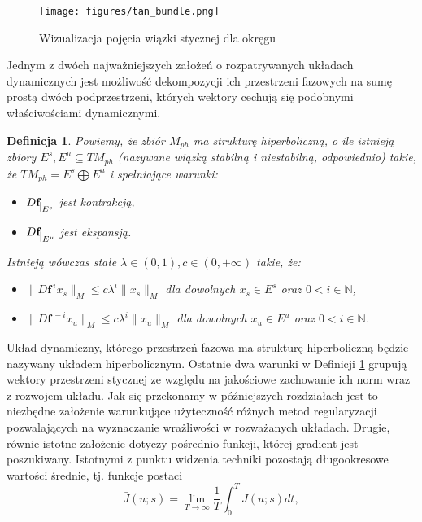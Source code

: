 \documentclass[12pt, twoside]{book}
\newtheorem{defi}{Definicja}
\begin{document}
\begin{figure}[H]
	\texttt{[image: figures/tan\_bundle.png]} 
	\centering
	\caption{Wizualizacja pojęcia wiązki stycznej dla okręgu}
	\label{Fig1}
\end{figure}
Jednym z dwóch najważniejszych założeń o rozpatrywanych układach dynamicznych jest możliwość dekompozycji ich przestrzeni fazowych na sumę prostą dwóch podprzestrzeni, których wektory cechują się podobnymi właściwościami dynamicznymi.
\begin{defi}\label{hyperbolic_set}
	Powiemy, że zbiór $M_{ph}$ ma strukturę hiperboliczną, o ile istnieją zbiory $ E^{s},E^{u} \subseteq TM_{ph}$ (nazywane wiązką stabilną i niestabilną, odpowiednio) takie, że $ TM_{ph} = E^{s} \bigoplus E^{u}$ i spełniające warunki:
	\begin{itemize}
		\item $ D\textbf{f}_{\mkern 1mu \vrule height 2ex\mkern2mu E^{s}} $ jest kontrakcją,
		\item $ D\textbf{f}_{\mkern 1mu \vrule height 2ex\mkern2mu E^{u}} $ jest ekspansją.
	\end{itemize}
	Istnieją wówczas stałe $ \lambda \in (0,1), c \in (0,+\infty) $ takie, że:
	\begin{itemize}
		\item $ \| D\textbf{f}^{\ i}x_{s}\|_{M} \leq c\lambda^{i} \| x_{s}\|_{M}$ dla dowolnych $ x_{s} \in E^{s} $ oraz $ 0 < i \in \mathbb{N} $,
		\item $ \| D\textbf{f}^{\ -i}x_{u}\|_{M} \leq c\lambda^{i} \| x_{u}\|_{M}$ dla dowolnych $ x_{u} \in E^{u} $ oraz $ 0 < i \in \mathbb{N} $.
	\end{itemize}
\end{defi}
Układ dynamiczny, którego przestrzeń fazowa ma strukturę hiperboliczną będzie nazywany układem hiperbolicznym. Ostatnie dwa warunki w Definicji \ref{hyperbolic_set} grupują wektory przestrzeni stycznej ze względu na jakościowe zachowanie ich norm wraz z rozwojem układu. Jak się przekonamy w późniejszych rozdziałach jest to niezbędne założenie warunkujące użyteczność różnych metod regularyzacji pozwalających na wyznaczanie wrażliwości w rozważanych układach. \newline
Drugie, równie istotne założenie dotyczy pośrednio funkcji, której gradient jest poszukiwany. Istotnymi z punktu widzenia techniki pozostają długookresowe wartości średnie, tj. funkcje postaci
\begin{equation}
\bar{J}(u;s) = \lim\limits_{T \rightarrow \infty}\frac{1}{T}\int_{0}^{T}J(u;s)dt,
\label{J_bar}
\end{equation}
\end{document}
